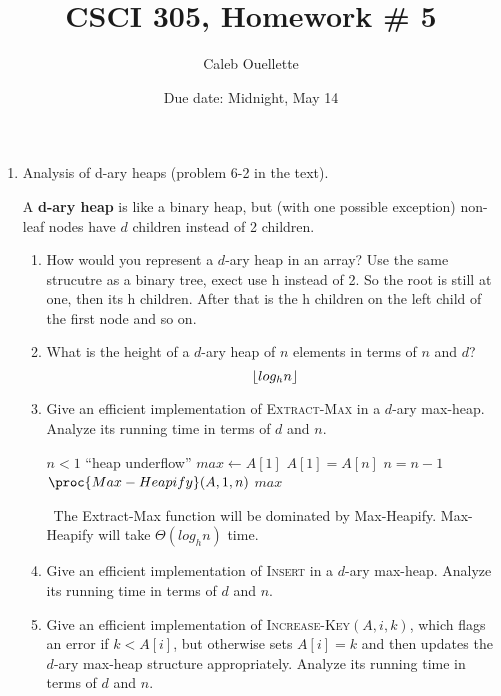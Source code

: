 \documentclass{article}
\title{CSCI 305, Homework \# 5}
\author{Caleb Ouellette}
\date{Due date:  Midnight, May 14}
\DeclarePairedDelimiter\floor{\lfloor}{\rfloor}
\begin{document}
  
  \maketitle
  
  \begin{enumerate}
  \item Analysis of d-ary heaps (problem 6-2 in the text).
  
   A \textbf{d-ary heap} is like a binary heap, but (with one possible
   exception) non-leaf nodes have $d$ children instead of 2 children.
   \begin{enumerate}
   \item How would you represent a $d$-ary heap in an array?
    Use the same strucutre as a binary tree, exect use h instead of 2. So the root is still at one, 
    then its h children. After that is the h children on the left child of the first node and so on.
     \item What is the height of a $d$-ary heap of $n$ elements in terms
       of $n$ and $d$? \\
       \begin{equation*}
        \floor*{log_h n}
       \end{equation*}

     \item Give an efficient implementation of \textsc{Extract-Max} in
         a $d$-ary max-heap.  Analyze its running time in terms of $d$
         and $n$.
         \begin{codebox}
          \li \If $n < 1$ \Do
          \li \Error ``heap underflow''
        \End
        \li $max \gets A[1]$
        \li $A[1] = A[n]$
        \li $n = n-1$
        \li $\proc{Max-Heapify}(A,1,n)$
        \li \Return $max$
        \end{codebox}
        \ The Extract-Max function will be dominated by Max-Heapify. Max-Heapify will take $\Theta(log_h n)$ time.



       \item Give an efficient implementation of \textsc{Insert} in
         a $d$-ary max-heap.  Analyze its running time in terms of $d$
         and $n$.
       \item Give an efficient implementation of
         \textsc{Increase-Key}$(A,i,k)$,
         which flags an error if $k < A[i]$, but otherwise sets $A[i] =
         k$ and then updates the $d$-ary max-heap structure
         appropriately.    Analyze its running time in terms of $d$
         and $n$.
   \end{enumerate}
  \end{enumerate}
  
  
\end{document}

